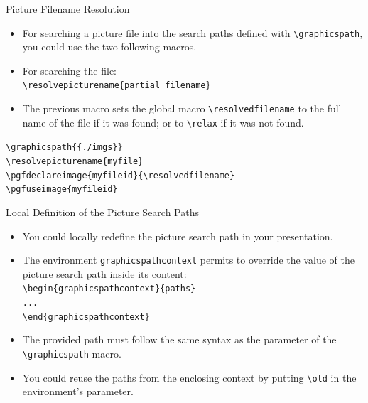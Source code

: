 \documentclass[english,sectioncirclenumberstyle]{le2iutbmbeamer}
\begin{document}
\begin{frame}{Picture Filename Resolution}
	\begin{itemize}
	\item For searching a picture file into the search paths defined with \texttt{{\textbackslash}graphicspath}, you could use the two following macros.
	\item For searching the file: \\
		\texttt{{\textbackslash}resolvepicturename\{partial filename\}}
	\item The previous macro sets the global macro \texttt{{\textbackslash}resolvedfilename} to the full name of the file if it was found; or to \texttt{{\textbackslash}relax} if it was not found.
	\end{itemize}
	\begin{example}
		\texttt{{\textbackslash}graphicspath\{\{./imgs\}\}} \\
		\texttt{{\textbackslash}resolvepicturename\{myfile\}} \\
		\texttt{{\textbackslash}pgfdeclareimage\{myfileid\}\{{\textbackslash}resolvedfilename\}} \\
		\texttt{{\textbackslash}pgfuseimage\{myfileid\}} \\
	\end{example}
\end{frame}

\begin{frame}{Local Definition of the Picture Search Paths}
	\begin{itemize}
	\item You could locally redefine the picture search path in your presentation.
	\item The environment \texttt{graphicspathcontext} permits to override the value of the picture search path inside its content: \\
			\texttt{{\textbackslash}begin\{graphicspathcontext\}\{paths\}} \\
			\texttt{...} \\
			\texttt{{\textbackslash}end\{graphicspathcontext\}}
	\item The provided path must follow the same syntax as the parameter of the \texttt{{\textbackslash}graphicspath} macro.
	\item You could reuse the paths from the enclosing context by putting \texttt{{\textbackslash}old} in the environment's parameter. \\
	\end{itemize}
\end{frame}
\end{document}
